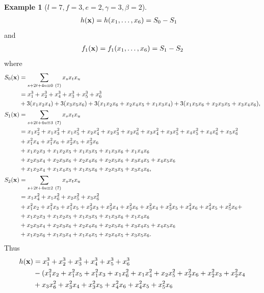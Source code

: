 \documentclass[a4paper, 11pt]{amsart}
\theoremstyle{plain}
\theoremstyle{definition}
\newtheorem{example}[thm]{Example}
\numberwithin{equation}{section}
\begin{document}
\begin{example}[$l=7, f=3, e=2, \gamma =3, \beta =2$]
\begin{align*}
h({\bf x})=h(x_1,\ldots,x_6)&=S_0 - S_1
\end{align*}
and
\begin{align*}
f_1({\bf x})=f_1(x_1,\ldots,x_6)=S_1-S_2
\end{align*}
where
\begin{align*}
S_0({\bf x})&= \sum_{s + 2t + 4u\equiv 0 \ (7)} x_{s}x_{t}x_{u}\\
&= x_1^3 + x_2^3 + x_4^3 + x_3^3 + x_5^3 + x_6^3\\
&+ 3(x_1x_2x_4) + 3(x_3x_5x_6) + 3(x_1x_2x_6 + x_2x_4x_5+x_1x_3x_4)  + 3(x_1x_5x_6 + x_2x_3x_5 +  x_3x_4x_6),\\
%
S_1({\bf x})&= \sum_{s + 2t + 4u\equiv 3 \ (7)} x_{s}x_{t}x_{u}\\
&=x_1x_2^2 + 
x_1x_3^2 + 
x_1x_5^2 +
x_2x_4^2 +
x_2x_3^2 +
x_2x_6^2 +
x_3x_4^2 + 
x_3x_5^2 +
x_4x_5^2 + 
x_4x_6^2 + 
x_5x_6^2 \\
%
&+x_1^2x_4 +
x_1^2x_6 + 
x_2^2x_5 +
x_3^2x_6 \\
%
&+x_1x_2x_3 + 
x_1x_2x_5 +
x_1x_3x_5 + 
x_1x_3x_6 +
x_1x_4x_6\\
&+ x_2x_3x_4 +
x_2x_3x_6 +
x_2x_4x_6 +
x_2x_5x_6 +
x_3x_4x_5 + 
x_4x_5x_6
\\
%
&+x_1x_2x_4 +
x_1x_4x_5 +
x_1x_5x_6
%
+x_2x_3x_5 +
x_3x_4x_6,\\
%
%
S_2({\bf x})&= \sum_{s + 2t + 4u\equiv 2 \ (7)} x_{s}x_{t}x_{u}\\
&= 
x_1x_4^2 +
x_1x_6^2 +
x_2 x_5^2+
x_3x_6^2 \\
&+ x_1^2x_2 +
x_1^2x_3 +
x_1^2x_5 +
%
x_2^2x_3 +
x_2^2x_4 +
x_2^2x_6 +
%
x_3^2x_4 +
x_3^2x_5 +
%
x_4^2x_6 +
x_4^2x_5 +
x_5^2x_6 +\\
%
&+ x_1x_2x_3 +
x_1x_2x_5 +
x_1x_3x_5 +
x_1x_3x_6 +
x_1x_4x_6\\
&+ x_2x_3x_4 +
x_2x_3x_6 +
x_2x_4x_6 +
x_2x_5x_6 +
x_3x_4x_5 +
x_4x_5x_6
\\
%
&+x_1x_2x_6 +
x_1x_3x_4 +
x_1x_4x_5
%
+ 
x_2x_4x_5 +
x_3x_5x_6.
%
\end{align*}
Thus
\begin{align*}
h({\bf x})&=x_1^3 + x_2^3 + x_3^3 + x_4^3 + x_5^3 + x_6^3\\
&- (x_1^2x_2 + x_1^2x_5 + x_1^2x_3 + x_1x_6^2+ x_1x_4^2   
%
+ x_2x_5^2 + x_2^2x_6  + x_2^2x_3 + x_2^2x_4 \\
%
&+ x_3x_6^2  + x_3^2x_4 + x_3^2x_5  + x_4^2x_6  + x_4^2x_5  + x_5^2x_6\\

\end{align*}
\end{example}
\end{document}
